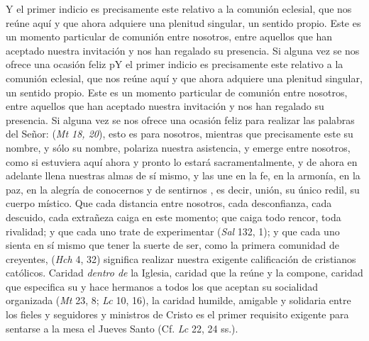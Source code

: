 \begin{body}
Y el primer indicio es precisamente este relativo a la comunión eclesial, que nos reúne aquí y que ahora adquiere una plenitud singular, un sentido propio. Este es un momento particular de comunión entre nosotros, entre aquellos que han aceptado nuestra invitación y nos han regalado su presencia. Si alguna vez se nos ofrece una ocasión feliz pY el primer indicio es precisamente este relativo a la comunión eclesial, que nos reúne aquí y que ahora adquiere una plenitud singular, un sentido propio. Este es un momento particular de comunión entre nosotros, entre aquellos que han aceptado nuestra invitación y nos han regalado su presencia. Si alguna vez se nos ofrece una ocasión feliz para realizar las palabras del Señor:  (\textit{Mt 18, 20}), esto es para nosotros, mientras que precisamente este su nombre, y sólo su nombre, polariza nuestra asistencia, y emerge entre nosotros, como si estuviera aquí ahora y pronto lo estará sacramentalmente, y de ahora en adelante llena nuestras almas de sí mismo, y las une en la fe, en la armonía, en la paz, en la alegría de conocernos y de sentirnos , es decir, unión, su único redil, su cuerpo místico. Que cada distancia entre nosotros, cada desconfianza, cada descuido, cada extrañeza caiga en este momento; que caiga todo rencor, toda rivalidad; y que cada uno trate de experimentar  (\textit{Sal} 132, 1); y que cada uno sienta en sí mismo que tener la suerte de ser, como la primera comunidad de creyentes,  (\textit{Hch} 4, 32) significa realizar nuestra exigente calificación de cristianos católicos. Caridad \textit{dentro de} la Iglesia, caridad que la reúne y la compone, caridad que especifica su  y hace hermanos a todos los que aceptan su socialidad organizada (\textit{Mt} 23, 8; \textit{Lc} 10, 16), la caridad humilde, amigable y solidaria entre los fieles y seguidores y ministros de Cristo es el primer requisito exigente para sentarse a la mesa el Jueves Santo (Cf. \textit{Lc} 22, 24 ss.). 


\end{body}
